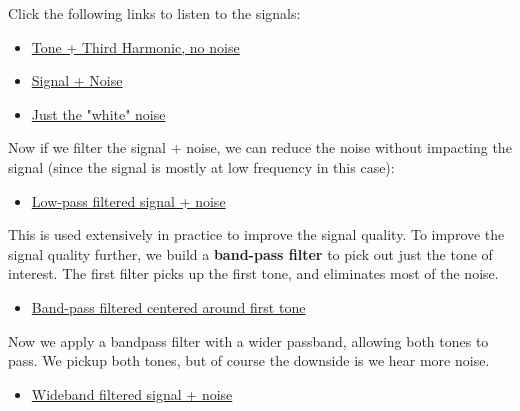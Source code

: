 \newpage
\noindent
Click the following links to listen to the signals:
\vspace{0.15cm}
    \begin{itemize}
        \item{\href{http://rfic.eecs.berkeley.edu/~niknejad/photos/ee105/tones.mp3}{Tone + Third Harmonic, no noise}}
        \item{\href{http://rfic.eecs.berkeley.edu/~niknejad/photos/ee105/tones\_noise.mp3}{Signal + Noise}}
        \item{\href{http://rfic.eecs.berkeley.edu/~niknejad/photos/ee105/noise.mp3}{Just the "white" noise}}
    \end{itemize}	
\vspace{0.15cm}
Now if we filter the signal + noise, we can reduce the noise without impacting the signal (since the signal is mostly at low frequency in this case):
\vspace{0.15cm}
    \begin{itemize}
        \item{\href{http://rfic.eecs.berkeley.edu/~niknejad/photos/ee105/tones\_lpf.mp3}{Low-pass filtered signal + noise}}
    \end{itemize}
\vspace{0.15cm}
 This is used extensively in practice to improve the signal quality.  To improve the signal quality further, we build a \textbf{band-pass filter} to pick out just the tone of interest.  The first filter picks up the first tone, and eliminates most of the noise.
\vspace{0.15cm}
    \begin{itemize}
        \item{\href{http://rfic.eecs.berkeley.edu/~niknejad/photos/ee105/tones\_bpf\_wC.mp3}{Band-pass filtered centered around first tone}}
    \end{itemize}
\vspace{0.15cm}
Now we apply a bandpass filter with a  wider passband, allowing both tones to pass.  We pickup both tones, but of course the downside is we hear more noise.
\vspace{0.15cm}
    \begin{itemize}
        \item{\href{http://rfic.eecs.berkeley.edu/~niknejad/photos/ee105/tones\_bpf.mp3}{Wideband filtered signal + noise}}
    \end{itemize}
